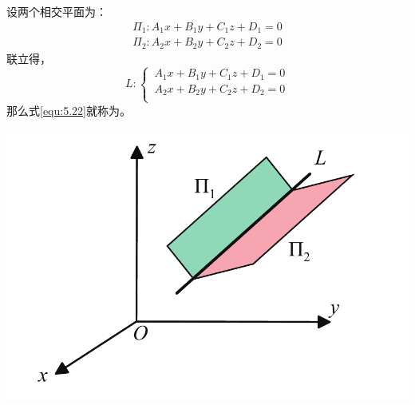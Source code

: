\noindent
\begin{minipage}{0.6\linewidth}
 设两个相交平面为：
\begin{equation*}
	\begin{split}
	\Pi_1:A_1x+B_1y+C_1z+D_1=0\\
	\Pi_2: A_2x+B_2y+C_2z+D_2=0
	\end{split}
\end{equation*}
联立得，
\begin{equation}
	L:\begin{cases}
	\, A_1x+B_1y+C_1z+D_1=0\\
	\, 	A_2x+B_2y+C_2z+D_2=0\\
		\end{cases}
	\label{equ:5.22}
\end{equation}
那么式\eqref{equ:5.22}就称为。
\vspace*{0.5em}
\end{minipage}
\begin{minipage}{0.4\linewidth}
	\centering
	\includegraphics[width = \linewidth]{pic/C-5/line}
	\vspace*{-3em}
	\label{直线的点法式方程}
\end{minipage}
\vspace*{0.5em}

